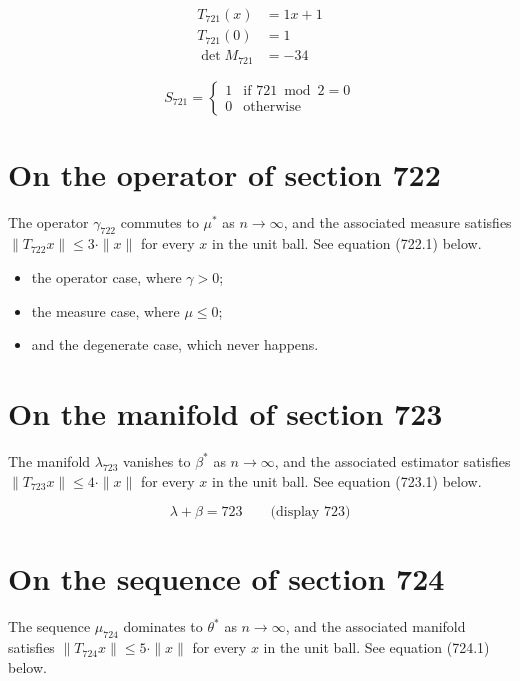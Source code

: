 \documentclass{article}
\begin{document}
\begin{align}
T_{721}(x) &= 1 x + 1 \\
T_{721}(0) &= 1 \\
\det M_{721} &= -34
\end{align}

\begin{equation}
S_{721} = \begin{cases} 1 & \text{if } 721 \bmod 2 = 0 \\ 0 & \text{otherwise} \end{cases}
\end{equation}

\section{On the operator of section 722}
The operator $\gamma_{722}$ commutes to $\mu^{*}$ as $n \to \infty$,
and the associated measure satisfies $\|T_{722} x\| \leq 3 \cdot \|x\|$
for every $x$ in the unit ball. See equation (722.1) below.

\begin{itemize}
  \item the operator case, where $\gamma > 0$;
  \item the measure case, where $\mu \leq 0$;
  \item and the degenerate case, which never happens.
\end{itemize}

\section{On the manifold of section 723}
The manifold $\lambda_{723}$ vanishes to $\beta^{*}$ as $n \to \infty$,
and the associated estimator satisfies $\|T_{723} x\| \leq 4 \cdot \|x\|$
for every $x$ in the unit ball. See equation (723.1) below.

$$
\lambda + \beta = 723 \qquad \text{(display 723)}
$$

\section{On the sequence of section 724}
The sequence $\mu_{724}$ dominates to $\theta^{*}$ as $n \to \infty$,
and the associated manifold satisfies $\|T_{724} x\| \leq 5 \cdot \|x\|$
for every $x$ in the unit ball. See equation (724.1) below.
\end{document}
